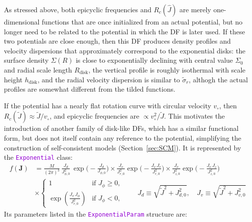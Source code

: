\documentclass[12pt]{article}
\newcommand{\ttt}[1]{\textcolor{darkviolet}{\texttt{#1}}}
\newcommand{\bJ}{\boldsymbol{J}}
\begin{document}
As stressed above, both epicyclic frequencies and $R_c(\hat J)$ are merely one-dimensional functions that are once initialized from an actual potential, but no longer need to be related to the potential in which the DF is later used. If these two potentials are close enough, then this DF produces density profiles and velocity dispersions that approximately correspond to the exponential disks: the surface density $\Sigma(R)$ is close to exponentially declining with central value $\Sigma_0$ and radial scale length $R_\mathrm{disk}$, the vertical profile is roughly isothermal with scale height $h_\mathrm{disk}$, and the radial velocity dispersion is similar to $\tilde\sigma_r$, althogh the actual profiles are somewhat different from the tilded functions.

If the potential has a nearly flat rotation curve with circular velocity $v_\circ$, then $R_c(\tilde J) \approx \tilde J/v_\circ$, and epicyclic frequencies are $\propto v_\circ^2 / \tilde J$. This motivates the introduction of another family of disk-like DFs, which has a similar functional form, but does not itself contain any reference to the potential, simplifying the construction of self-consistent models (Section~\ref{sec:SCM}). It is represented by the \ttt{Exponential} class:
\begin{align*}
f(\bJ) &= \frac{M}{(2\pi)^3}\, \frac{J_d}{J_{\phi,0}^2}\, \exp\bigg(-\frac{J_d}{J_{\phi,0}}\bigg) \times
\frac{J_v}{J_{r,0}^2} \exp\bigg(-\frac{J_v\,J_r}{J_{r,0}^2}\bigg) \times
\frac{J_v}{J_{z,0}^2} \exp\bigg(-\frac{J_v\,J_z}{J_{z,0}^2}\bigg) \\
&\times \left\{ \begin{array}{ll}  1 & \mbox{if }J_\phi\ge 0, \\
\exp\left(\frac{J_v\,J_\phi}{J_{r,0}^2} \right) & \mbox{if }J_\phi<0, \end{array} \right. \qquad
J_d \equiv \sqrt{\tilde J^2 + J_{d,0}^2}, \quad
J_v \equiv \sqrt{\tilde J^2 + J_{v,0}^2}
\end{align*}
Its parameters listed in the \ttt{ExponentialParam} structure are:
\end{document}
